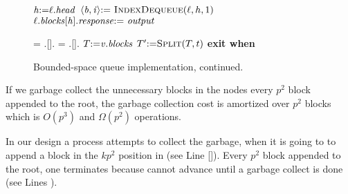 \begin{figure}
\begin{algorithmic}[1]
{	    \State {}
    \EndIf
{}

\spac

    \State {}
        \State $\mbox{\textnormal{\textit{h}}} \mbox{:=} \ell.\mbox{\textit{head}}$
            \State $\langle\var{b}, \var{i}\rangle \assign\ \Call{IndexDequeue}{\ell, h, 1}$
            \State {} \assign\  
            \State $\ell.\fld{blocks}[\var{h}].\fld{response} \assign\ \var{output}$
        \EndIf
    \EndFor
{}

\spac 

    \State {}
    \State {} = .[].\eleft
    \State {} = .[].\eright
        \State $T \mbox{:=} \mbox{\textnormal{\textit{v}}}.\mbox{\textit{blocks}}$
        \State $T'  \assign \Call{Split}{T,t}$ 
        \State \bf{exit when} \label{splitCASGC}
    \EndFor
     
        \State {}
        \State {}
    \EndIf
{}
}
\end{algorithmic}
\caption{\label{pseudocode2GC}Bounded-space queue implementation, continued. }
\end{figure}

If we garbage collect the unnecessary blocks in the nodes every $p^2$ block appended to the root, the garbage collection cost is amortized over $p^2$ blocks which is $O(p^3)$ and $\Omega(p^2)$ operations.

In our design a process attempts to collect the garbage, when it is going to to append a block in the $kp^2$ position in  (see Line \ref{}). Every $p^2$  block appended to the root, one  terminates because  cannot advance until a  garbage collect is done (see Lines ).

